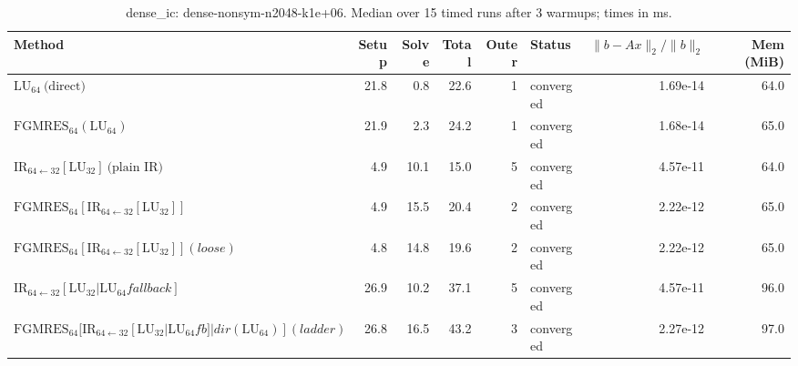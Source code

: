 \begin{table}[t]
\centering
\small
\caption{dense_ic: dense-nonsym-n2048-k1e+06. Median over 15 timed runs after 3 warmups; times in ms.}
\label{tab:dense_ic-dense-nonsym-n2048-k1e+06}
\begin{tabular}{lrrrrlrr}
\hline
Method & Setup & Solve & Total & Outer & Status & $\|b-Ax\|_2/\|b\|_2$ & Mem (MiB) \\
\hline
$\mathrm{LU}_{64}\ \text{(direct)}$ & 21.8 & 0.8 & 22.6 & 1 & converged & 1.69e-14 & 64.0 \\
$\mathrm{FGMRES}_{64}(\mathrm{LU}_{64})$ & 21.9 & 2.3 & 24.2 & 1 & converged & 1.68e-14 & 65.0 \\
$\mathrm{IR}_{64\leftarrow 32}[\mathrm{LU}_{32}]\ \text{(plain IR)}$ & 4.9 & 10.1 & 15.0 & 5 & converged & 4.57e-11 & 64.0 \\
$\mathrm{FGMRES}_{64}[\mathrm{IR}_{64\leftarrow 32}[\mathrm{LU}_{32}]]$ & 4.9 & 15.5 & 20.4 & 2 & converged & 2.22e-12 & 65.0 \\
$\mathrm{FGMRES}_{64}[\mathrm{IR}_{64\leftarrow 32}[\mathrm{LU}_{32}]] (loose)$ & 4.8 & 14.8 & 19.6 & 2 & converged & 2.22e-12 & 65.0 \\
$\mathrm{IR}_{64\leftarrow 32}[\mathrm{LU}_{32} | \mathrm{LU}_{64} fallback]$ & 26.9 & 10.2 & 37.1 & 5 & converged & 4.57e-11 & 96.0 \\
$\mathrm{FGMRES}_{64}[\mathrm{IR}_{64\leftarrow 32}[\mathrm{LU}_{32}|\mathrm{LU}_{64} fb]|dir(\mathrm{LU}_{64})] (ladder)$ & 26.8 & 16.5 & 43.2 & 3 & converged & 2.27e-12 & 97.0 \\
\hline
\end{tabular}
\end{table}
